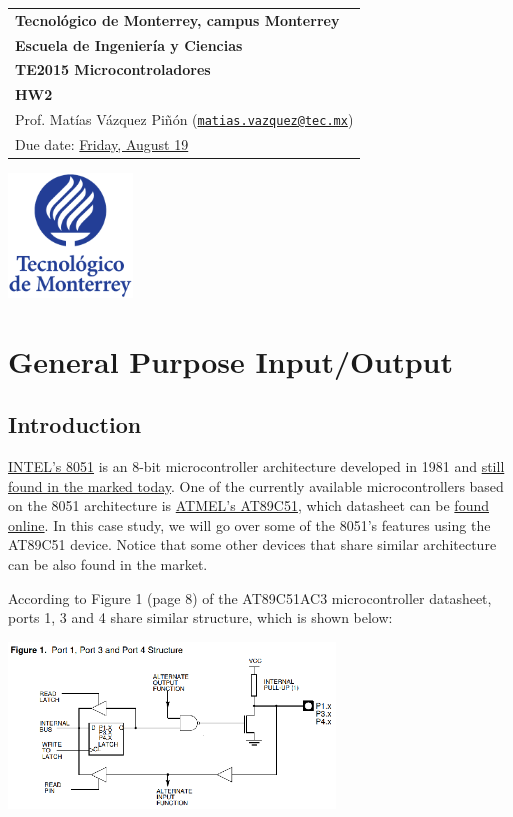 \documentclass[10pt, letterpaper]{article}
\makeatletter
\def\tecdemty{Tecnol\'ogico de Monterrey, campus Monterrey}
\def\school{Escuela de Ingenier\'ia y Ciencias}
\def\me{Prof. Mat\'ias V\'azquez Pi\~n\'on (\href{mailto:matias.vazquez@tec.mx}{\texttt{matias.vazquez@tec.mx}})}
\def\course{TE2015 Microcontroladores}
\def\doctitle{HW2 }
\makeatother
\begin{document}
\noindent
	\begin{tabular}[b]{@{}l@{}}
	{\bfseries\Large\tecdemty}\\ [1mm]
	{\bfseries\large\school}\\ [5mm]
	{\bfseries\large\course}\\ [1mm]
	{\bfseries\large{\doctitle}}\\ [1mm]
	{\large\me} \\ [1mm]
	{\large Due date: \href{https://experiencia21.tec.mx/courses/286463/assignments/9678285}{Friday, August 19}} \\ [1mm] 

\end{tabular}	\hfill
\includegraphics[height=1.3in]{img/logoTec.eps}

\section*{General Purpose Input/Output}
\subsection*{Introduction}
\href{https://en.wikipedia.org/wiki/Intel_8051}{INTEL’s 8051} is an 8-bit microcontroller architecture developed in 1981 and \href{https://www.digikey.com.mx/es/products/filter/integrados-microcontroladores/685?s=N4IgjCBcoKwAwDYqgMZQGYEMA2BnApgDQgD2UA2iAEwAcCAnFXCALrEAOALlCAMqcAnAJYA7AOYgAvtKA}{still found in the marked today}. One of the currently available microcontrollers based on the 8051 architecture is \href{https://en.wikipedia.org/wiki/Atmel_AT89_series}{ATMEL’s AT89C51}, which datasheet can be \href{http://ww1.microchip.com/downloads/en/devicedoc/doc4383.pdf}{found online}. In this case study, we will go over some of the 8051’s features using the AT89C51 device. Notice that some other devices that share similar architecture can be also found in the market. 

According to Figure 1 (page 8) of the AT89C51AC3 microcontroller datasheet, ports 1, 3 and 4 share similar structure, which is shown below:

\begin{center}
\includegraphics[width=0.65\textwidth]{img/fig01.eps}
\end{center}
\end{document}
